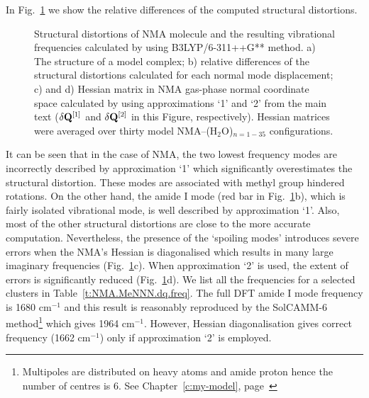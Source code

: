 \documentclass[b5paper,oneside,fleqn,11pt]{book}
\begin{document}
\begin{refsection}
In Fig.~\ref{f.NMA.dq} we show the relative differences of the computed structural distortions.
%
\begin{figure}[ht]
\centering
\setlength\fboxsep{0.4pt}
\setlength\fboxrule{0.5pt}
\caption{Structural distortions of NMA molecule and the resulting vibrational
frequencies calculated by using B3LYP/6-311++G** method. 
a) The structure of a model complex; b) relative differences of the
structural distortions
calculated for each normal mode displacement; c) and d) Hessian matrix in NMA gas-phase normal coordinate
space calculated by using approximations `1' and `2' from the main text 
($\delta {\bf Q}^{[1]}$ and $\delta {\bf Q}^{[2]}$ in this Figure, respectively).
Hessian matrices were averaged over thirty model NMA--(H$_2$O)$_{n=1-35}$ configurations.
\label{f.NMA.dq}}
\end{figure}
%
It can be seen that in the case of NMA, the two lowest frequency modes are incorrectly
described by approximation `1' which significantly overestimates the structural distortion. 
These modes are associated with methyl group hindered rotations. On the other hand, the
amide I mode (red bar in Fig.~\ref{f.NMA.dq}b), which is fairly isolated vibrational mode, is well described by 
approximation `1'. Also, most of the other structural distortions are close to the more accurate
computation. Nevertheless, the presence of the `spoiling modes' introduces
severe errors when the NMA's Hessian is diagonalised which results in many large imaginary 
frequencies (Fig.~\ref{f.NMA.dq}c). 
When approximation `2' is used, the extent of errors is significantly 
reduced (Fig.~\ref{f.NMA.dq}d). We list all the frequencies
for a selected clusters in Table~\ref{t:NMA.MeNNN.dq.freq}.
The full DFT amide I mode
frequency is 1680 cm$^{-1}$ and this result is reasonably reproduced by the SolCAMM-6 method\footnote{Multipoles
are distributed on heavy atoms and amide proton hence the number of centres is 6. See Chapter~\ref{c:my-model}, 
page~\pageref{p:solx-electrost-contracted}}
which gives 1964 cm$^{-1}$. However, Hessian diagonalisation gives correct frequency (1662 cm$^{-1}$) 
only if approximation `2' 
is employed.


\end{refsection}
\end{document}
